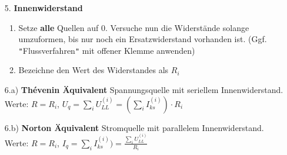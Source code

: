 \iend
\begin{itemize}

	\item[5.] \textbf{Innenwiderstand}
	      \begin{enumerate}
	      	\item Setze \textbf{alle} Quellen auf 0. Versuche nun die Widerstände solange umzuformen, bis nur noch ein Ersatzwiderstand vorhanden ist. (Ggf. \texttt{"}Flussverfahren\texttt{"} mit offener Klemme anwenden)
	      	\item Bezeichne den Wert des Widerstandes als $R_i$
	      \end{enumerate}
	\item[6.a)] \textbf{Thévenin Äquivalent} Spannungsquelle mit seriellem Innenwiderstand. \\
	      Werte: $\displaystyle   R= R_i$, $U_q = \sum_i U_{LL}^{(i)} = (\sum_i I_{ks}^{(i)})\cdot R_i$

	\item[6.b)] \textbf{Norton Äquivalent} Stromquelle mit parallelem Innenwiderstand. \\
	      Werte: $\displaystyle  R= R_i$, $I_q = \sum_i I_{ks}^{(i)}) = \frac{\sum_i U_{LL}^{(i)}}{R_i}$

\end{itemize}

